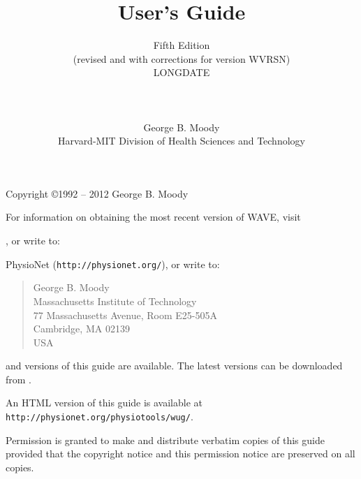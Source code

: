 \documentclass[twoside]{book}
\title{\WAVE{} User's Guide}
\author{Fifth Edition\\
(revised and with corrections for \WAVE{} version WVRSN)\\
LONGDATE\\
\\
\\
\\
George B. Moody\\
Harvard-MIT Division of Health Sciences and Technology}
\date{}
\newcommand{\WAVE}{{\sf WAVE}\xspace}
\begin{document}
\begin{htmlonly}
\end{htmlonly}
\begin{latexonly}
\end{latexonly}

\maketitle

\pagestyle{empty}
\vspace*{\fill}
\noindent
Copyright \copyright 1992 -- 2012 George B. Moody

\vspace{1 in}
\noindent
For information on obtaining the most recent version of \WAVE{},
visit
\begin{htmlonly}
, or write to:
\end{htmlonly}
\begin{latexonly}
PhysioNet ({\tt http://physionet.org/}), or write to:
\end{latexonly}

\begin{quote}
George B. Moody\\
Massachusetts Institute of Technology\\
77 Massachusetts Avenue, Room E25-505A\\
Cambridge, MA 02139\\
USA\\
\end{quote}

\begin{htmlonly}
\noindent
{} and
 versions of this guide are available.
The latest versions can be downloaded from
.
\end{htmlonly}
\begin{latexonly}
\noindent
An HTML version of this guide is available at
{\tt http://physio\-net.\-org/\-physio\-tools/\-wug/}.
\end{latexonly}

\vspace{0.2 in}
\noindent
Permission is granted to make and distribute verbatim copies of this
guide provided that the copyright notice and this permission notice are
preserved on all copies.
\end{document}
